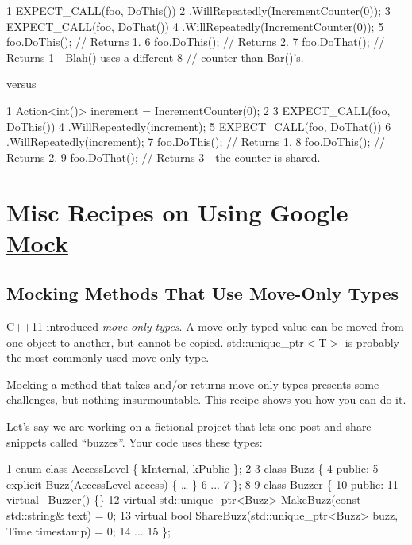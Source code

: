 \begin{DoxyCode}
1 EXPECT\_CALL(foo, DoThis())
2     .WillRepeatedly(IncrementCounter(0));
3 EXPECT\_CALL(foo, DoThat())
4     .WillRepeatedly(IncrementCounter(0));
5 foo.DoThis();  // Returns 1.
6 foo.DoThis();  // Returns 2.
7 foo.DoThat();  // Returns 1 - Blah() uses a different
8                // counter than Bar()'s.
\end{DoxyCode}


versus


\begin{DoxyCode}
1 Action<int()> increment = IncrementCounter(0);
2 
3 EXPECT\_CALL(foo, DoThis())
4     .WillRepeatedly(increment);
5 EXPECT\_CALL(foo, DoThat())
6     .WillRepeatedly(increment);
7 foo.DoThis();  // Returns 1.
8 foo.DoThis();  // Returns 2.
9 foo.DoThat();  // Returns 3 - the counter is shared.
\end{DoxyCode}


\section*{Misc Recipes on Using Google \hyperlink{class_mock}{Mock}}

\subsection*{Mocking Methods That Use Move-\/\+Only Types}

C++11 introduced {\itshape move-\/only types}. A move-\/only-\/typed value can be moved from one object to another, but cannot be copied. {\ttfamily std\+::unique\+\_\+ptr$<$T$>$} is probably the most commonly used move-\/only type.

Mocking a method that takes and/or returns move-\/only types presents some challenges, but nothing insurmountable. This recipe shows you how you can do it.

Let’s say we are working on a fictional project that lets one post and share snippets called “buzzes”. Your code uses these types\+:


\begin{DoxyCode}
1 enum class AccessLevel \{ kInternal, kPublic \};
2 
3 class Buzz \{
4  public:
5   explicit Buzz(AccessLevel access) \{ … \}
6   ...
7 \};
8 
9 class Buzzer \{
10  public:
11   virtual ~Buzzer() \{\}
12   virtual std::unique\_ptr<Buzz> MakeBuzz(const std::string& text) = 0;
13   virtual bool ShareBuzz(std::unique\_ptr<Buzz> buzz, Time timestamp) = 0;
14   ...
15 \};
\end{DoxyCode}


